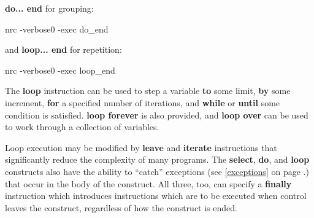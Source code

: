\textbf{do... end} for grouping:


\begin{shaded}
\bash[stdout]
nrc -verbose0 -exec do_end
\END
\end{shaded}

and \textbf{loop... end} for repetition:


\begin{shaded}
\bash[stdout]
nrc -verbose0 -exec loop_end
\END
\end{shaded}

The \textbf{loop} instruction can be used to step a variable
\textbf{to} some limit, \textbf{by} some increment, \textbf{for} a
specified number of iterations, and \textbf{while} or \textbf{until}
some condition is satisfied. \textbf{loop forever} is also provided,
and \textbf{loop over} can be used to work through a collection of
variables.

Loop execution may be modified by \textbf{leave} and \textbf{iterate} instructions that significantly reduce the complexity of many programs.
The \textbf{select}, \textbf{do}, and \textbf{loop} constructs also have the ability to “catch”
exceptions (see \ref{exceptions} on page \pageref{exceptions}.) that occur in the body of the construct. All
three, too, can specify a \textbf{finally} instruction which introduces
instructions which are to be executed when control leaves the
construct, regardless of how the construct is ended.


